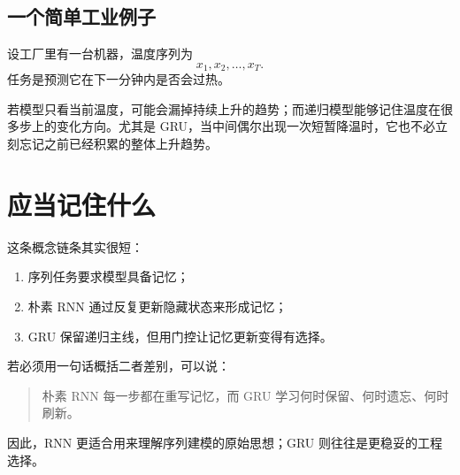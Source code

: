 \documentclass[12pt,a4paper]{ctexart}
\begin{document}
\subsection{一个简单工业例子}

设工厂里有一台机器，温度序列为
\[
x_1, x_2, \dots, x_T.
\]
任务是预测它在下一分钟内是否会过热。

若模型只看当前温度，可能会漏掉持续上升的趋势；而递归模型能够记住温度在很多步上的变化方向。尤其是 GRU，当中间偶尔出现一次短暂降温时，它也不必立刻忘记之前已经积累的整体上升趋势。

\section{应当记住什么}

这条概念链条其实很短：
\begin{enumerate}
  \item 序列任务要求模型具备记忆；
  \item 朴素 RNN 通过反复更新隐藏状态来形成记忆；
  \item GRU 保留递归主线，但用门控让记忆更新变得有选择。
\end{enumerate}

若必须用一句话概括二者差别，可以说：
\begin{quote}
朴素 RNN 每一步都在重写记忆，而 GRU 学习何时保留、何时遗忘、何时刷新。
\end{quote}

因此，RNN 更适合用来理解序列建模的原始思想；GRU 则往往是更稳妥的工程选择。
\end{document}
